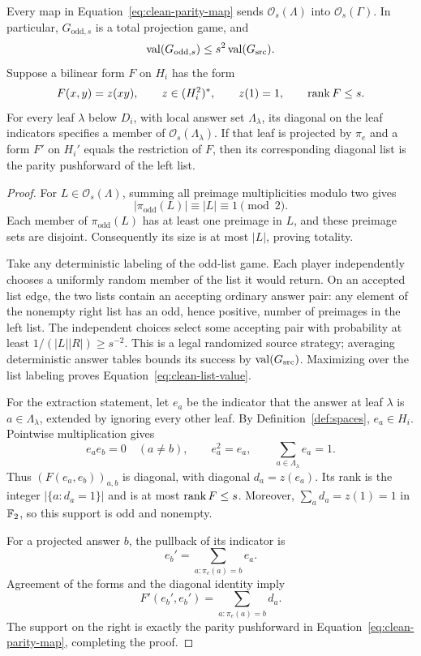 \begin{lemma}
\label{lem:parity-game}
Every map in Equation~\eqref{eq:clean-parity-map} sends
$\mathcal O_s(\Lambda)$ into $\mathcal O_s(\Gamma)$.  In particular,
$G_{\mathrm{odd},s}$ is a total projection game, and
\begin{equation}
 \operatorname{val}(G_{\mathrm{odd},s})\le s^2\operatorname{val}(G_{\mathrm{src}}).
 \label{eq:clean-list-value}
\end{equation}
Suppose a bilinear form $F$ on $H_i$ has the form
\[
 F(x,y)=z(xy),\qquad z\in(H_i^2)^*,\qquad z(1)=1,
 \qquad \operatorname{rank} F\le s.
\]
For every leaf $\lambda$ below $D_i$, with local answer set
$\Lambda_\lambda$, its diagonal on the leaf indicators specifies a
member of $\mathcal O_s(\Lambda_\lambda)$.  If that leaf is projected
by $\pi_e$ and a form $F'$ on $H_i'$ equals the restriction of $F$,
then its corresponding diagonal list is the parity pushforward of
the left list.
\end{lemma}

\begin{proof}
For $L\in\mathcal O_s(\Lambda)$, summing all preimage multiplicities
modulo two gives
\[
 |\pi_{\mathrm{odd}}(L)|\equiv |L|\equiv1\pmod2.
\]
Each member of $\pi_{\mathrm{odd}}(L)$ has at least one preimage in
$L$, and these preimage sets are disjoint.  Consequently its size is
at most $|L|$, proving totality.

Take any deterministic labeling of the odd-list game.  Each player
independently chooses a uniformly random member of the list it would
return.  On an accepted list edge, the two lists contain an accepting
ordinary answer pair: any element of the nonempty right list has an
odd, hence positive, number of preimages in the left list.  The
independent choices select some accepting pair with probability at
least $1/(|L||R|)\ge s^{-2}$.  This is a legal randomized source
strategy; averaging deterministic answer tables bounds its success
by $\operatorname{val}(G_{\mathrm{src}})$.  Maximizing over the list labeling proves
Equation~\eqref{eq:clean-list-value}.

For the extraction statement, let $e_a$ be the indicator that the
answer at leaf $\lambda$ is $a\in\Lambda_\lambda$, extended by
ignoring every other leaf.  By Definition~\ref{def:spaces},
$e_a\in H_i$.  Pointwise multiplication gives
\[
 e_ae_b=0\quad(a\ne b),\qquad e_a^2=e_a,
 \qquad \sum_{a\in\Lambda_\lambda}e_a=1.
\]
Thus $(F(e_a,e_b))_{a,b}$ is diagonal, with diagonal
$d_a=z(e_a)$.  Its rank is the integer $|\{a:d_a=1\}|$ and is at
most $\operatorname{rank} F\le s$.  Moreover,
$\sum_a d_a=z(1)=1$ in $\mathbb F_2$, so this support is odd and nonempty.

For a projected answer $b$, the pullback of its indicator is
\[
 e_b'=\sum_{a:\pi_e(a)=b}e_a.
\]
Agreement of the forms and the diagonal identity imply
\begin{equation}
 F'(e_b',e_b')
 =\sum_{a:\pi_e(a)=b}d_a.
 \label{eq:clean-indicator-pushforward}
\end{equation}
The support on the right is exactly the parity pushforward in
Equation~\eqref{eq:clean-parity-map}, completing the proof.
\end{proof}


